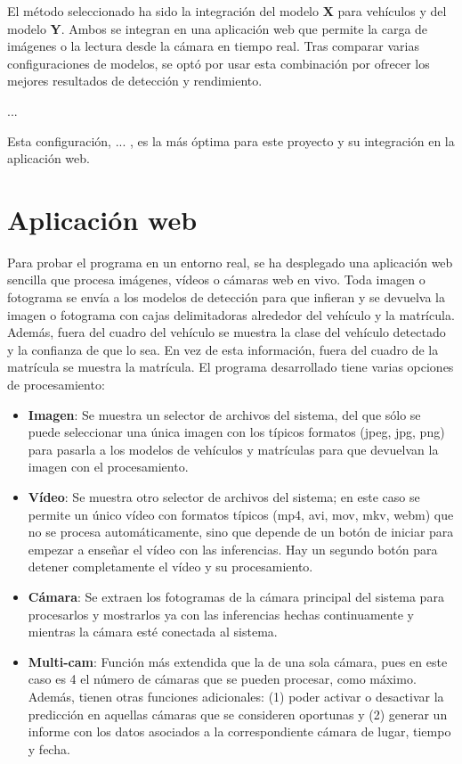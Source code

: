 \documentclass[12pt,a4paper,onecolumn,oneside]{report}
\begin{document}
El método seleccionado ha sido la integración del modelo \textbf{X} para vehículos y del modelo \textbf{Y}. Ambos se integran en una aplicación web que permite la carga de imágenes o la lectura desde la cámara en tiempo real. Tras comparar varias configuraciones de modelos, se optó por usar esta combinación por ofrecer los mejores resultados de detección y rendimiento. %
 
... %

Esta configuración, ... , es la más óptima para este proyecto y su integración en la aplicación web.



\chapter{Aplicación web}
\label{Aplicación web}

Para probar el programa en un entorno real, se ha desplegado una aplicación web sencilla que procesa imágenes, vídeos o cámaras web en vivo. Toda imagen o fotograma se envía a los modelos de detección para que infieran y se devuelva la imagen o fotograma con cajas delimitadoras alrededor del vehículo y la matrícula. Además, fuera del cuadro del vehículo se muestra la clase del vehículo detectado y la confianza de que lo sea. En vez de esta información, fuera del cuadro de la matrícula se muestra la matrícula. El programa desarrollado tiene varias opciones de procesamiento:
\begin{itemize}
    \item \textbf{Imagen}: Se muestra un selector de archivos del sistema, del que sólo se puede seleccionar una única imagen con los típicos formatos (jpeg, jpg, png) para pasarla a los modelos de vehículos y matrículas para que devuelvan la imagen con el procesamiento.
    \item \textbf{Vídeo}: Se muestra otro selector de archivos del sistema; en este caso se permite un único vídeo con formatos típicos (mp4, avi, mov, mkv, webm) que no se procesa automáticamente, sino que depende de un botón de iniciar para empezar a enseñar el vídeo con las inferencias. Hay un segundo botón para detener completamente el vídeo y su procesamiento.
    \item \textbf{Cámara}: Se extraen los fotogramas de la cámara principal del sistema para procesarlos y mostrarlos ya con las inferencias hechas continuamente y mientras la cámara esté conectada al sistema.
    \item \textbf{Multi-cam}: Función más extendida que la de una sola cámara, pues en este caso es 4 el número de cámaras que se pueden procesar, como máximo. Además, tienen otras funciones adicionales: (1) poder activar o desactivar la predicción en aquellas cámaras que se consideren oportunas y (2) generar un informe con los datos asociados a la correspondiente cámara de lugar, tiempo y fecha.
\end{itemize}
\end{document}
